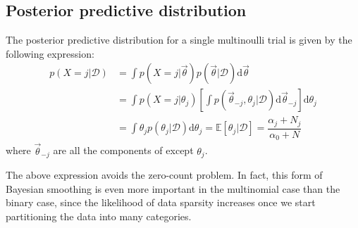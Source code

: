 \subsection{Posterior predictive distribution}
The posterior predictive distribution for a single multinoulli trial is given by the following expression:
\begin{align}
p(X=j|\mathcal{D})& =\int p(X=j|\vec{\theta})p(\vec{\theta}|\mathcal{D})\mathrm{d}\vec{\theta} \\
    & =\int p(X=j|\theta_j)\left[\int p(\vec{\theta}_{-j}, \theta_j|\mathcal{D})\mathrm{d}\vec{\theta}_{-j}\right]\mathrm{d}\theta_j \\
	& =\int \theta_jp(\theta_j|\mathcal{D})\mathrm{d}\theta_j=\mathbb{E}[\theta_j|\mathcal{D}]=\dfrac{\alpha_j+N_j}{\alpha_0+N}
\end{align}
where $\vec{\theta}_{-j}$ are all the components of \vec{\theta} except $\theta_j$.

The above expression avoids the zero-count problem. In fact, this form of Bayesian smoothing is even more important in the multinomial case than the binary case, since the likelihood of data sparsity increases once we start partitioning the data into many categories.


